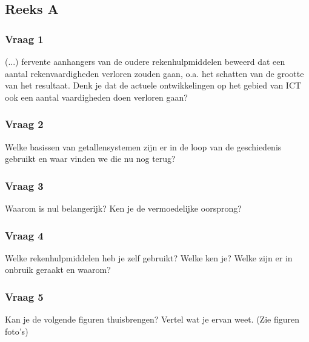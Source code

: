 \documentclass[../main.tex]{subfiles}
\begin{document}
\subsection{Reeks A}

\subsubsection{Vraag 1}
\begin{question}(...) fervente aanhangers van de oudere rekenhulpmiddelen beweerd dat een aantal rekenvaardigheden verloren zouden gaan, o.a. het schatten van de grootte van het resultaat. Denk je dat de actuele ontwikkelingen op het gebied van ICT ook een aantal vaardigheden doen verloren gaan?
\end{question}

\begin{solution}
\lipsum[1]
\end{solution}

\subsubsection{Vraag 2}
\begin{question}
Welke basissen van getallensystemen zijn er in de loop van de geschiedenis gebruikt en waar vinden we die nu nog terug?
\end{question}

\subsubsection{Vraag 3}
\begin{question}
Waarom is nul belangerijk? Ken je de vermoedelijke oorsprong?
\end{question}

\subsubsection{Vraag 4}
\begin{question}
Welke rekenhulpmiddelen heb je zelf gebruikt? Welke ken je? Welke zijn er in onbruik geraakt en waarom?
\end{question}

\subsubsection{Vraag 5}
\begin{question}
Kan je de volgende figuren thuisbrengen? Vertel wat je ervan weet. (Zie figuren foto’s)
\end{question}
\end{document}
